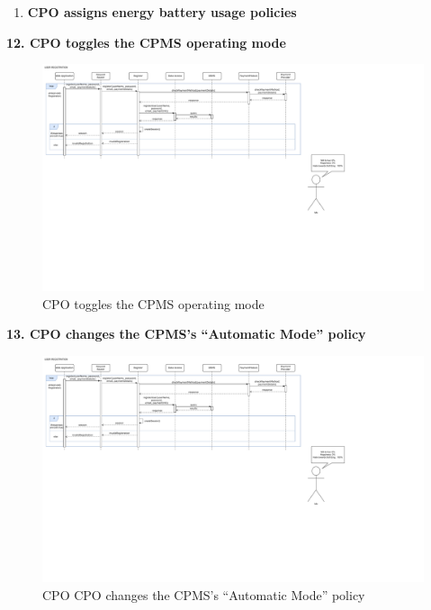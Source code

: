 \documentclass[11pt]{article}
\begin{document}
\begin{description}
\begin{enumerate}
\begin{description}
        \end{description}
        \item \textbf{CPO assigns energy battery usage policies}
    \end{enumerate}
    
    \newpage
    
    \item \textbf{12. CPO toggles the CPMS operating mode}
    \begin{figure}[!ht]
        \centering
        \includegraphics[page={12}, trim=0cm 16cm 28cm 1cmm, width=0.95\linewidth, clip]{RuntimeDiagrams.pdf}
        \caption{CPO toggles the CPMS operating mode}
    \end{figure}
    
    \item \textbf{13. CPO changes the CPMS’s “Automatic Mode” policy}
    \begin{figure}[!ht]
        \centering
        \includegraphics[page={13}, trim=0cm 15cm 27cm 1cmm, width=0.95\linewidth, clip]{RuntimeDiagrams.pdf}
        \caption{CPO CPO changes the CPMS’s “Automatic Mode” policy}
    \end{figure}
\end{description}
\end{document}
